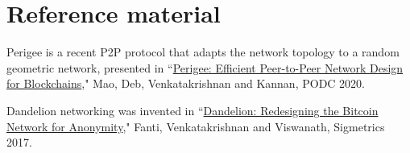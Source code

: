 \documentclass{article}
\begin{document}


\section*{Reference material}

{\sf Perigee} is a recent P2P protocol that adapts the network topology to a random geometric network, presented in ``\href{https://dl.acm.org/doi/abs/10.1145/3382734.3405704}{Perigee: Efficient Peer-to-Peer Network Design for Blockchains}," 
Mao, Deb, Venkatakrishnan and Kannan, PODC 2020. %

{\sf Dandelion} networking was invented in ``\href{https://dl.acm.org/doi/abs/10.1145/3084459}{Dandelion: Redesigning the Bitcoin Network for Anonymity}," Fanti, Venkatakrishnan and Viswanath, Sigmetrics 2017. 
\end{document}
